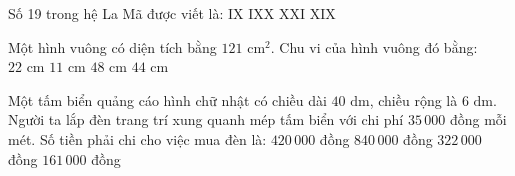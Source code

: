 \documentclass[12pt,a4paper]{article}
\begin{document}
\begin{ex}
Số 19 trong hệ La Mã được viết là:
\choice
{IX}
{IXX}
{XXI}
{\True XIX}
\end{ex}

\begin{ex}
Một hình vuông có diện tích bằng $121\text{ cm}^2$. Chu vi của hình vuông đó bằng:
\choice
{$22\text{ cm}$}
{$11\text{ cm}$}
{$48\text{ cm}$}
{\True $44\text{ cm}$}
\end{ex}

\begin{ex}
Một tấm biển quảng cáo hình chữ nhật có chiều dài $40\text{ dm}$, chiều rộng là $6\text{ dm}$. Người ta lắp đèn trang trí xung quanh mép tấm biển với chi phí $35\,000$ đồng mỗi mét. Số tiền phải chi cho việc mua đèn là:
\choice
{\True $420\,000$ đồng}
{$840\,000$ đồng}
{$322\,000$ đồng}
{$161\,000$ đồng}
\end{ex}
\end{document}
